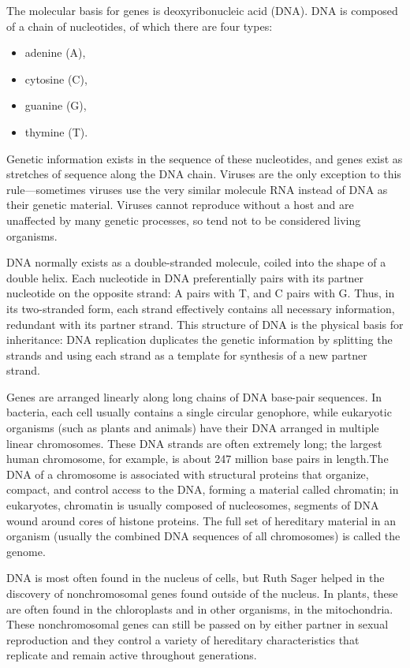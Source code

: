 The molecular basis for genes is deoxyribonucleic acid (DNA).
DNA is composed of a chain of nucleotides, of which there are four types:
\begin{itemize}
	\item adenine (A),
	\item cytosine (C),
	\item guanine (G),
	\item thymine (T).
\end{itemize}
Genetic information exists in the sequence of these nucleotides, and genes exist as stretches of
sequence along the DNA chain.
Viruses are the only exception to this rule—sometimes viruses use the very similar molecule RNA
instead of DNA as their genetic material.
Viruses cannot reproduce without a host and are unaffected by many genetic processes,
so tend not to be considered living organisms.

DNA normally exists as a double-stranded molecule, coiled into the shape of a double helix.
Each nucleotide in DNA preferentially pairs with its partner nucleotide on the opposite strand:
A pairs with T, and C pairs with G. Thus, in its two-stranded form, each strand effectively
contains all necessary information, redundant with its partner strand.
This structure of DNA is the physical basis for inheritance: DNA replication duplicates the
genetic information by splitting the strands and using each strand as a template for synthesis of a
new partner strand.

Genes are arranged linearly along long chains of DNA base-pair sequences. In bacteria, each cell 
usually contains a single circular genophore, while eukaryotic organisms 
(such as plants and animals) have their DNA arranged in multiple linear chromosomes.
These DNA strands are often extremely long; the largest human chromosome, for example,
is about 247 million base pairs in length.The DNA of a chromosome is associated with
structural proteins that organize, compact, and control access to the DNA, forming a material
called chromatin; in eukaryotes, chromatin is usually composed of nucleosomes, 
segments of DNA wound around cores of histone proteins.
The full set of hereditary material in an organism (usually the combined DNA sequences of all 
chromosomes) is called the genome.

DNA is most often found in the nucleus of cells, but Ruth Sager helped in the discovery of
nonchromosomal genes found outside of the nucleus.
In plants, these are often found in the chloroplasts and in other organisms, in the mitochondria.
These nonchromosomal genes can still be passed on by either partner in sexual reproduction and
they control a variety of hereditary characteristics that replicate and remain active throughout 
generations.

